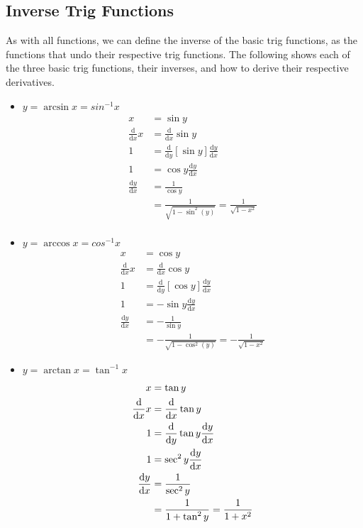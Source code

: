\documentclass[12pt]{article}
\begin{document}
\subsection{Inverse Trig Functions}
As with all functions, we can define the inverse of the basic trig functions, as the functions that undo their respective trig functions. The following shows each of the three basic trig functions, their inverses, and how to derive their respective derivatives.

\begin{itemize}
    \item $y = \arcsin x = sin^{-1}x$
    \begin{equation}
    \begin{split}
        x &= \sin y \\
        \frac{\text{d}}{\text{d}x}x &= \frac{\text{d}}{\text{d}x} \sin y\\
        1 &= \frac{\text{d}}{\text{d}y}[\sin y]\frac{\text{d}y}{\text{d}x}\\
        1 &= \cos y \frac{\text{d}y}{\text{d}x}\\
        \frac{\text{d}y}{\text{d}x} &= \frac{1}{\cos y}\\
        &= \frac{1}{\sqrt{1-\sin^2(y)}} = \frac{1}{\sqrt{1-x^2}}\\
    \end{split}        
\end{equation}

    \item $y = \arccos x = cos^{-1}x$
    \begin{equation}
        \begin{split}
            x &= \cos y\\
            \frac{\text{d}}{\text{d}x} x &= \frac{\text{d}}{\text{d}x} \cos y\\
            1 &= \frac{\text{d}}{\text{d}y}[\cos y] \frac{\text{d}y}{\text{d}x}\\
            1 &= -\sin y \frac{\text{d}y}{\text{d}x}\\
            \frac{\text{d}y}{\text{d}x} &= -\frac{1}{\sin y}\\
            &= -\frac{1}{\sqrt{1-\cos^2(y)}} = -\frac{1}{\sqrt{1-x^2}}
        \end{split}
    \end{equation}

    \item $y = \arctan x = \tan^{-1} x$
    \begin{equation}
        \begin{split}
            x &= \tan y\\
            \frac{\text{d}}{\text{d}x} x &= \frac{\text{d}}{\text{d}x} \tan y\\
            1 &= \frac{\text{d}}{\text{d}y} \tan y \frac{\text{d}y}{\text{d}x}\\
            1 &= \sec^2 y \frac{\text{d}y}{\text{d}x}\\
            \frac{\text{d}y}{\text{d}x} &= \frac{1}{\sec^2 y}\\
            &= \frac{1}{1+\tan^2 y} = \frac{1}{1+x^2}\\
        \end{split}
    \end{equation}
\end{itemize}
\end{document}
